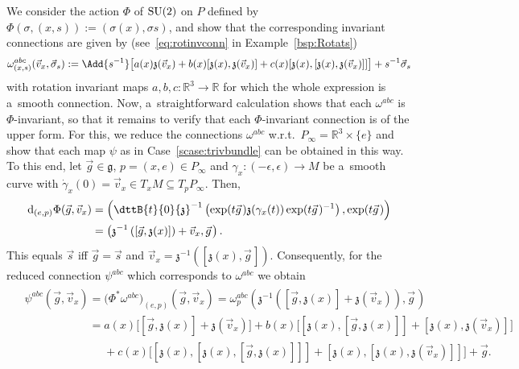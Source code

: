 \documentclass[pdftex]{sigma}
\numberwithin{equation}{section}
\begin{document}
We consider the action $\Phi$ of ${\rm SU}(2)$ on $P$ def\/ined by $\Phi(\sigma, (x,s)):=(\sigma(x),\sigma s)$, and show that the
corresponding invariant connections are given by (see~\eqref{eq:rotinvconn} in Example~\ref{bsp:Rotats})
\begin{gather*}
\omega^{abc}_{(x,s)}(\vec{v}_x,\vec{\sigma}_s):= \Add{s^{-1}}\big[a(x){\mathfrak{z}}(\vec{v}_x)+ b(x)[{\mathfrak{z}}(x),{\mathfrak{z}}(\vec{v}_x)]
+c(x)[{\mathfrak{z}}(x),[{\mathfrak{z}}(x),{\mathfrak{z}}(\vec{v}_x)]]\big]+ s^{-1}\vec{\sigma}_s
\end{gather*}
with rotation invariant maps $a,b,c\colon \mathbb{R}^3\rightarrow \mathbb{R}$ for which the whole expression is a~smooth
connection.
Now, a~straightforward calculation shows that each $\omega^{abc}$ is $\Phi$-invariant, so that it remains to verify that
each $\Phi$-invariant connection is of the upper form.
For this, we reduce the connections $\omega^{abc}$ w.r.t.~$P_\infty=\mathbb{R}^3\times \{e\}$ and show that each map
$\psi$ as in Case~\ref{scase:trivbundle} can be obtained in this way.
To this end, let $\vec{g}\in \mathfrak{g}$, $p=(x,e)\in P_\infty$ and $\gamma_x\colon (-\epsilon,\epsilon)\rightarrow M$ be
a~smooth curve with $\dot\gamma_x(0)=\vec{v}_x\in T_xM\subseteq T_pP_\infty$.
Then,
\begin{gather}
\begin{split}
& \mathrm{d}_{(e,p)}\Phi(\vec{g},\vec{v}_x)
=\left(\dttB{t}{0}{\mathfrak{z}}^{-1}\left(\exp(t\vec{g}\hspace{1pt}){\mathfrak{z}}(\gamma_x(t))\exp(t\vec{g}\hspace{1pt})^{-1}\right),
\exp(t\vec{g}\hspace{1pt})\right)
\\
& \phantom{\mathrm{d}_{(e,p)}\Phi(\vec{g},\vec{v}_x)}
=\left({\mathfrak{z}}^{-1}\left([\vec{g},{\mathfrak{z}}(x)]\right)+\vec{v}_x,\vec{g}\hspace{1pt}\right).
\end{split}
\label{eq:theta}
\end{gather}
This equals $\vec{s}$ if\/f $\vec{g}=\vec{s}$ and $\vec{v}_x={\mathfrak{z}}^{-1}([{\mathfrak{z}}(x),\vec{g}\hspace{1pt}])$.
Consequently, for the reduced connection $\psi^{abc}$ which corresponds to $\omega^{abc}$ we obtain
\begin{gather*}
\begin{split}
& \psi^{abc}(\vec{g},\vec{v}_x) =\big(\Phi^{*}\omega^{abc}\big)_{(e,p)}(\vec{g},\vec{v}_x)
=\omega^{abc}_{p}\left({\mathfrak{z}}^{-1}\left([\vec{g},{\mathfrak{z}}(x)]+{\mathfrak{z}}(\vec{v}_x)\right),\vec{g}\hspace{1pt}\right)
\\
& \phantom{\psi^{abc}(\vec{g},\vec{v}_x)}
=a(x)\big[[\vec{g},{\mathfrak{z}}(x)]+{\mathfrak{z}}(\vec{v}_x)\big]+ b(x)\big[[{\mathfrak{z}}(x),[\vec{g},{\mathfrak{z}}(x)]]+[{\mathfrak{z}}(x),{\mathfrak{z}}(\vec{v}_x)]\big]
\\
&\phantom{\psi^{abc}(\vec{g},\vec{v}_x)=}
{}+c(x)\big[[{\mathfrak{z}}(x),[{\mathfrak{z}}(x),[\vec{g},{\mathfrak{z}}(x)]]]+[{\mathfrak{z}}(x),[{\mathfrak{z}}(x),{\mathfrak{z}}(\vec{v}_x)]]\big] +\vec{g}.
\end{split}
\end{gather*}
\end{document}
